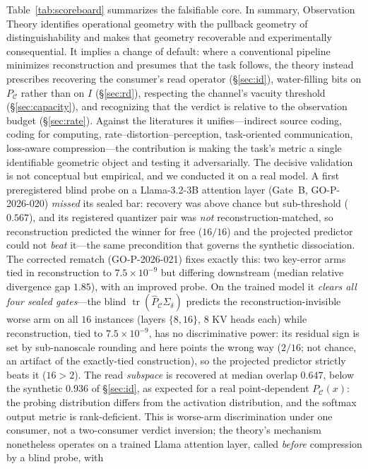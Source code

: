 \documentclass[lettersize,onecolumn]{IEEEtran}
\theoremstyle{definition}
\theoremstyle{remark}
\newcommand{\PC}{P_{\mathcal{C}}}
\newcommand{\Sd}{\Sigma_{\delta}}
\newcommand{\tr}{\operatorname{tr}}
\begin{document}
Table~\ref{tab:scoreboard} summarizes the falsifiable core. In summary, Observation
Theory identifies operational geometry with the pullback geometry of distinguishability
and makes that geometry recoverable and experimentally consequential. It implies a change of default: where a conventional pipeline minimizes
reconstruction and presumes that the task follows, the theory instead prescribes
recovering the consumer's read operator (\S\ref{sec:id}), water-filling bits on $\PC$
rather than on $I$
(\S\ref{sec:rd}), respecting the channel's vacuity threshold (\S\ref{sec:capacity}),
and recognizing that the verdict is relative to the observation budget
(\S\ref{sec:rate}). Against
the literatures it unifies---indirect source coding, coding for computing,
rate--distortion--perception, task-oriented communication, loss-aware
compression---the contribution is making the task's metric a single identifiable
geometric object and testing it adversarially. The decisive validation is not
conceptual but empirical, and we conducted it on a real model. A first preregistered
blind probe on a Llama-3.2-3B attention layer (Gate~B, GO-P-2026-020) \emph{missed} its
sealed bar: recovery was above chance but sub-threshold ($0.567$), and its registered
quantizer pair was \emph{not} reconstruction-matched, so reconstruction predicted the
winner for free ($16/16$) and the projected predictor could not \emph{beat} it---the
same precondition that governs the synthetic dissociation. The corrected rematch
(GO-P-2026-021) fixes exactly this: two key-error arms tied in reconstruction to
$7.5\!\times\!10^{-9}$ but differing downstream (median relative divergence gap
$1.85$), with an improved probe. On the trained model it \emph{clears all four sealed
gates}---the blind $\tr(\hat\PC\Sd)$ predicts the reconstruction-invisible worse arm on
all $16$ instances (layers $\{8,16\}$, $8$ KV heads each) while reconstruction, tied to
$7.5\!\times\!10^{-9}$, has no discriminative power: its residual sign is set by
sub-nanoscale rounding and here points the wrong way ($2/16$; not chance, an artifact
of the exactly-tied construction), so the projected predictor strictly beats it
($16>2$). The read \emph{subspace} is recovered at median overlap $0.647$, below the
synthetic $0.936$ of \S\ref{sec:id}, as expected for a real point-dependent $\PC(x)$:
the probing distribution differs from the activation distribution, and the softmax
output metric is rank-deficient. This is worse-arm discrimination under one consumer,
not a two-consumer verdict inversion; the theory's mechanism nonetheless operates on a
trained Llama attention layer, called \emph{before} compression by a blind probe, with
\end{document}
